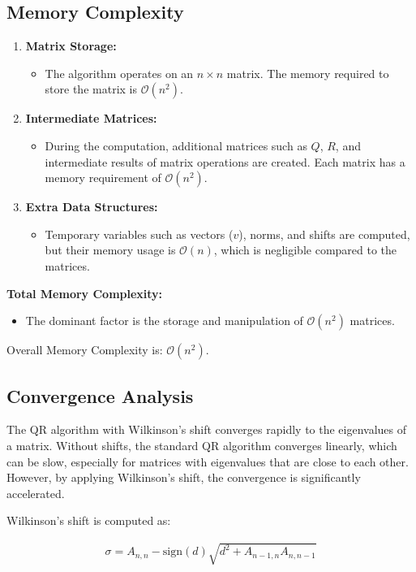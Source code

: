 \documentclass[journal]{IEEEtran}
\begin{document}
\subsection{Memory Complexity}
\begin{enumerate}
    \item \textbf{Matrix Storage:}
    \begin{itemize}
        \item The algorithm operates on an $n \times n$ matrix. The memory required to store the matrix is $\mathcal{O}(n^2)$.
    \end{itemize}

    \item \textbf{Intermediate Matrices:}
    \begin{itemize}
        \item During the computation, additional matrices such as $Q$, $R$, and intermediate results of matrix operations are created. Each matrix has a memory requirement of $\mathcal{O}(n^2)$.
    \end{itemize}

    \item \textbf{Extra Data Structures:}
    \begin{itemize}
        \item Temporary variables such as vectors ($v$), norms, and shifts are computed, but their memory usage is $\mathcal{O}(n)$, which is negligible compared to the matrices.
    \end{itemize}
\end{enumerate}
\noindent \textbf{Total Memory Complexity:}
\begin{itemize}
    \item The dominant factor is the storage and manipulation of $\mathcal{O}(n^2)$ matrices.
\end{itemize}
Overall Memory Complexity is: $\mathcal{O}(n^2)$.
\subsection{Convergence Analysis}
The QR algorithm with Wilkinson's shift converges rapidly to the eigenvalues of a matrix. Without shifts, the standard QR algorithm converges linearly, which can be slow, especially for matrices with eigenvalues that are close to each other. However, by applying Wilkinson's shift, the convergence is significantly accelerated.

Wilkinson's shift is computed as:

\begin{align}
\sigma = A_{n,n} - \text{sign}(d) \sqrt{d^2 + A_{n-1,n} A_{n,n-1}}
\end{align}
\end{document}
